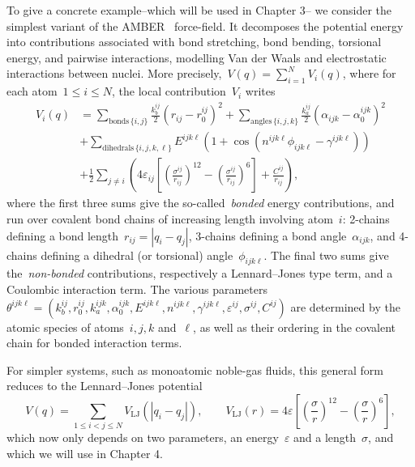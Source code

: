 To give a concrete example--which will be used in Chapter 3-- we consider the simplest variant of the AMBER~\cite{PCCRCDFSK95} force-field. It decomposes the potential energy into contributions associated with bond stretching, bond bending, torsional energy, and pairwise interactions, modelling Van der Waals and electrostatic interactions between nuclei.
More precisely,~$V(q)=\sum_{i=1}^{N}V_i(q)$, where for each atom~$1\leq i\leq N$, the local contribution~$V_i$ writes
\begin{equation}
\begin{split}
    \label{eq:01:amber}
    V_i(q)&=\sum_{\text{bonds}\,\{i,j\}} \frac{k_b^{ij}}{2}(r_{ij}-r_0^{ij})^2 + \sum_{\text{angles}\,\{i,j,k\}} \frac{k_a^{ij}}{2}(\alpha_{ijk}-\alpha_0^{ijk})^2 \\
    &+ \sum_{\text{dihedrals}\,\{i,j,k,\ell\}} E^{ijk\ell}\left(1+\cos(n^{ijk\ell}\phi_{ijk\ell}-\gamma^{ijk\ell})\right) \\
    &+ \frac12\sum_{j\neq i}\left(4\varepsilon_{ij}\left[\left(\frac{\sigma^{ij}}{r_{ij}}\right)^{12}-\left(\frac{\sigma^{ij}}{r_{ij}}\right)^6\right] + \frac{C^{ij}}{r_{ij}}\right),
\end{split}
\end{equation}
where the first three sums give the so-called~\textit{bonded} energy contributions, and run over covalent bond chains of increasing length involving atom~$i$: 2-chains defining a bond length~$r_{ij}=|q_i-q_j|$, 3-chains defining a bond angle~$\alpha_{ijk}$, and 4-chains defining a dihedral (or torsional) angle~$\phi_{ijk\ell}$. The final two sums give the~\textit{non-bonded} contributions, respectively a Lennard--Jones type term, and a Coulombic interaction term. The various parameters~$\theta^{ijk\ell}=\left(k_b^{ij},r_0^{ij},k_a^{ijk},\alpha_0^{ijk},E^{ijk\ell},n^{ijk\ell},\gamma^{ijk\ell},\varepsilon^{ij},\sigma^{ij},C^{ij}\right)$ are determined by the atomic species of atoms~$i,j,k$ and~$\ell$, as well as their ordering in the covalent chain for bonded interaction terms.

For simpler systems, such as monoatomic noble-gas fluids, this general form reduces to the Lennard--Jones potential
\begin{equation}
    \label{eq:01:lennard_jones}
    V(q) = \sum_{1\leq i < j \leq N} V_{\mathrm{LJ}}\left(|q_i-q_j|\right),\qquad V_{\mathrm{LJ}}(r) = 4\varepsilon \left[\left(\frac{\sigma}{r}\right)^{12}-\left(\frac{\sigma}{r}\right)^6\right],
\end{equation}
which now only depends on two parameters, an energy~$\varepsilon$ and a length~$\sigma$, and which we will use in Chapter 4.

